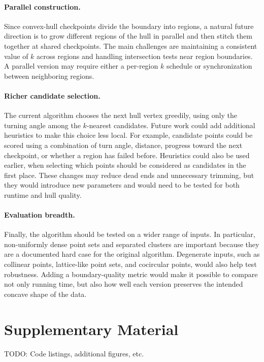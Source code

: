 \documentclass[10pt,twocolumn]{article}
\begin{document}
\paragraph{Parallel construction.} Since convex-hull checkpoints divide the boundary into regions, a natural future direction is to grow different regions of the hull in parallel and then stitch them together at shared checkpoints. The main challenges are maintaining a consistent value of \(k\) across regions and handling intersection tests near region boundaries. A parallel version may require either a per-region \(k\) schedule or synchronization between neighboring regions.

\paragraph{Richer candidate selection.} The current algorithm chooses the next hull vertex greedily, using only the turning angle among the \(k\)-nearest candidates. Future work could add additional heuristics to make this choice less local. For example, candidate points could be scored using a combination of turn angle, distance, progress toward the next checkpoint, or whether a region has failed before. Heuristics could also be used earlier, when selecting which points should be considered as candidates in the first place. These changes may reduce dead ends and unnecessary trimming, but they would introduce new parameters and would need to be tested for both runtime and hull quality.

\paragraph{Evaluation breadth.}
Finally, the algorithm should be tested on a wider range of inputs. In particular, non-uniformly dense point sets and separated clusters are important because they are a documented hard case for the original algorithm. Degenerate inputs, such as collinear points, lattice-like point sets, and cocircular points, would also help test robustness. Adding a boundary-quality metric would make it possible to compare not only running time, but also how well each version preserves the intended concave shape of the data.


\appendix
\section{Supplementary Material}
TODO: Code listings, additional figures, etc.
\end{document}
